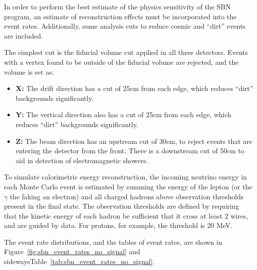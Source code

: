 In order to perform the best estimate of the physics sensitivity of the SBN program, an estimate of reconstruction effects must be incorporated into the event rates.  Additionally, some analysis cuts to reduce cosmic and ``dirt'' events are included.

The simplest cut is the fiducial volume cut applied in all three detectors.  Events with a vertex found to be outside of the fiducial volume are rejected, and the volume is set as:
\begin{itemize}
\item{\bf X:} The drift direction has a cut of 25cm from each edge, which reduces ``dirt'' backgrounds significantly.
\item{\bf Y:} The vertical direction also has a cut of 25cm from each edge, which reduces ``dirt'' backgrounds significantly.
\item{\bf Z:} The beam direction has an upstream cut of 30cm, to reject events that are entering the detector from the front.  There is a downstream cut of 50cm to aid in detection of electromagnetic showers.
\end{itemize}

To simulate calorimetric energy reconstruction, the incoming neutrino energy in each Monte Carlo event is estimated by summing the energy of the lepton (or the $\gamma$ the faking an electron) and all charged hadrons above observation thresholds present in the final state.  The observation thresholds are defined by requiring that the kinetic energy of each hadron be sufficient that it cross at least 2 wires, and are guided by \argoneut data.  For protons, for example, the threshold is 20 MeV. 

The event rate distributions, and the tables of event rates, are shown in Figure~\ref{fig:sbn_event_rates_no_signal} and sidewaysTable~\ref{tab:sbn_event_rates_no_signal}.

